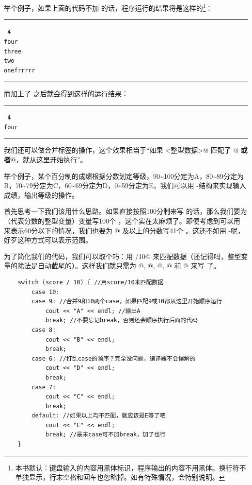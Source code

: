 举个例子，如果上面的代码不加 \lstinline@break@ 的话，程序运行的结果将是这样的\footnote{本书默认：键盘输入的内容用黑体标识，程序输出的内容不用黑体。换行符不单独显示，行末空格和回车也忽略掉。如有特殊情况，会特别说明。}：
\\\noindent\rule{\linewidth}{0.2pt}\texttt{
\textbf{4}\\
four\\
three\\
two\\
onefrrrrr
}\\\noindent\rule{\linewidth}{0.2pt}
而加上了 \lstinline@break@ 之后就会得到这样的运行结果：\pagebreak
\\\noindent\rule{\linewidth}{0.2pt}\texttt{
\textbf{4}\\
four
}\\\noindent\rule{\linewidth}{0.2pt}\par
我们还可以做合并标签的操作，这个效果相当于``如果 \lstinline@<整型数据>@ 匹配了 @ \textbf{或者}\linebreak{}@，就从这里开始执行''。\par
举个例子，某个百分制的成绩根据分数划定等级，90\~{}100分定为A，80\~{}89分定为B，70\~{}79分定为C，60\~{}69分定为D，0\~{}59分定为E。我们可以用 \lstinline@switch@-\lstinline@case@ 结构来实现输入成绩，输出等级的操作。\par
首先思考一下我们该用什么思路。如果直接按照100分制来写 \lstinline@case@ 的话，那么我们要为 \lstinline@score@ （代表分数的整型变量）变量写100个 \lstinline@case@，这个实在太麻烦了。即便考虑到可以用 \lstinline@default@ 来表示60分以下的情况，我们也要为 @ 及以上的分数写41个 \lstinline@case@。这还不如用 \lstinline@if@-\lstinline@else@ 呢，好歹这种方式可以表示范围。\par
为了简化我们的代码，我们可以取个巧：用 \lstinline@score/10@ 来匹配数据（还记得吗，整型变量的除法是自动截尾的）。这样我们就只需为 @, @, @, @ 和 @ 来写 \lstinline@case@ 了。\par
\begin{lstlisting}
    switch (score / 10) { //用score/10来匹配数据
        case 10:
        case 9: //合并9和10两个case，如果匹配9或10都从这里开始顺序运行
            cout << "A" << endl; //输出A
            break; //不要忘记break，否则还会顺序执行后面的代码
        case 8:
            cout << "B" << endl;
            break;
        case 6: //打乱case的顺序？完全没问题，编译器不会误解的
            cout << "D" << endl;
            break;
        case 7:
            cout << "C" << endl;
            break;
        default: //如果以上均不匹配，就应该是E等了吧
            cout << "E" << endl;
            break; //最末case可不加break，加了也行
    }
\end{lstlisting}
